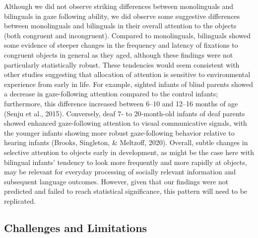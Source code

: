 \documentclass[english,,man,floatsintext]{apa6}
\begin{document}
Although we did not observe striking differences between monolinguals and bilinguals in gaze following ability, we did observe some suggestive differences between monolinguals and bilinguals in their overall attention to the objects (both congruent and incongruent). Compared to monolinguals, bilinguals showed some evidence of steeper changes in the frequency and latency of fixations to congruent objects in general as they aged, although these findings were not particularly statistically robust. These tendencies would seem consistent with other studies suggesting that allocation of attention is sensitive to environmental experience from early in life. For example, sighted infants of blind parents showed a decrease in gaze-following attention compared to the control infants; furthermore, this difference increased between 6--10 and 12--16 months of age (Senju et al., 2015). Conversely, deaf 7- to 20-month-old infants of deaf parents showed enhanced gaze-following attention to visual communicative signals, with the younger infants showing more robust gaze-following behavior relative to hearing infants (Brooks, Singleton, \& Meltzoff, 2020). Overall, subtle changes in selective attention to objects early in development, as might be the case here with bilingual infants' tendency to look more frequently and more rapidly at objects, may be relevant for everyday processing of socially relevant information and subsequent language outcomes. However, given that our findings were not predicted and failed to reach statistical significance, this pattern will need to be replicated.

\hypertarget{challenges-and-limitations}{%
\subsection{Challenges and Limitations}\label{challenges-and-limitations}}
\end{document}
